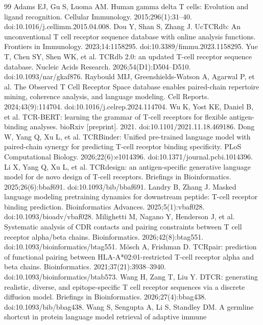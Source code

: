 \documentclass[12pt]{article}
\begin{document}
\begin{thebibliography}{99}
 Adams EJ, Gu S, Luoma AM.
Human gamma delta T cells: Evolution and ligand recognition.
Cellular Immunology. 2015;296(1):31--40. doi:10.1016/j.cellimm.2015.04.008.
 Dou Y, Shan S, Zhang J.
UcTCRdb: An unconventional T cell receptor sequence database with online analysis
functions. Frontiers in Immunology. 2023;14:1158295.
doi:10.3389/fimmu.2023.1158295.
 Yue T, Chen SY, Shen WK, et al.
TCRdb 2.0: an updated T-cell receptor sequence database.
Nucleic Acids Research. 2026;54(D1):D504--D510.
doi:10.1093/nar/gkaf876.
 Raybould MIJ, Greenshields-Watson A, Agarwal P, et al.
The Observed T Cell Receptor Space database enables paired-chain repertoire
mining, coherence analysis, and language modeling.
Cell Reports. 2024;43(9):114704. doi:10.1016/j.celrep.2024.114704.
 Wu K, Yost KE, Daniel B, et al.
TCR-BERT: learning the grammar of T-cell receptors for flexible antigen-binding
analyses. bioRxiv [preprint]. 2021. doi:10.1101/2021.11.18.469186.
 Dong W, Yang Q, Xu L, et al.
TCRBinder: Unified pre-trained language model with paired-chain synergy for
predicting T-cell receptor binding specificity.
PLoS Computational Biology. 2026;22(6):e1014396. doi:10.1371/journal.pcbi.1014396.
 Li X, Yang Q, Xu L, et al.
TCRdesign: an antigen-specific generative language model for de novo design of
T-cell receptors. Briefings in Bioinformatics. 2025;26(6):bbaf691.
doi:10.1093/bib/bbaf691.
 Landry B, Zhang J.
Masked language modeling pretraining dynamics for downstream peptide:
T-cell receptor binding prediction. Bioinformatics Advances. 2025;5(1):vbaf028.
doi:10.1093/bioadv/vbaf028.
 Milighetti M, Nagano Y, Henderson J, et al.
Systematic analysis of CDR contacts and pairing constraints between T cell
receptor alpha/beta chains.
Bioinformatics. 2026;42(8):btag551. doi:10.1093/bioinformatics/btag551.
 M\"osch A, Frishman D.
TCRpair: prediction of functional pairing between HLA-A*02:01-restricted
T-cell receptor alpha and beta chains.
Bioinformatics. 2021;37(21):3938--3940. doi:10.1093/bioinformatics/btab573.
 Wang H, Zang T, Liu Y.
DTCR: generating realistic, diverse, and epitope-specific T cell receptor
sequences via a discrete diffusion model. Briefings in Bioinformatics.
2026;27(4):bbag438. doi:10.1093/bib/bbag438.
 Wang S, Sengupta A, Li S, Standley DM.
A germline shortcut in protein language model retrieval of adaptive immune

\end{thebibliography}
\end{document}
